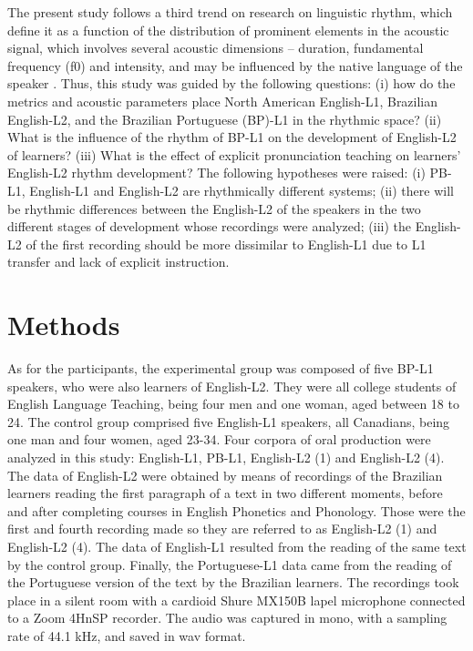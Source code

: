 The present study follows a third trend on research on linguistic rhythm, which
define it as a function of the distribution of prominent elements in the
acoustic signal, which involves several acoustic dimensions – duration,
fundamental frequency (f0) and intensity, and may be influenced by the native
language of the speaker \citep{cumming2010,fuchs2016,silva2020}.
Thus, this study was guided by the following questions: (i) how do the metrics
and acoustic parameters place North American English-L1, Brazilian English-L2,
and the Brazilian Portuguese (BP)-L1 in the rhythmic space? (ii) What is the
influence of the rhythm of BP-L1 on the development of English-L2 of learners?
(iii) What is the effect of explicit pronunciation teaching on learners'
English-L2 rhythm development? The following hypotheses were raised: (i) PB-L1,
English-L1 and English-L2 are rhythmically different systems; (ii) there will
be rhythmic differences between the English-L2 of the speakers in the two
different stages of development whose recordings were analyzed; (iii) the
English-L2 of the first recording should be more dissimilar to English-L1 due
to L1 transfer and lack of explicit instruction. 

\section{Methods}
As for the participants, the experimental group was composed of five BP-L1
speakers, who were also learners of English-L2. They were all college students
of English Language Teaching, being four men and one woman, aged between 18 to
24. The control group comprised five English-L1 speakers, all Canadians, being
one man and four women, aged 23-34. Four corpora of oral production were
analyzed in this study: English-L1, PB-L1, English-L2 (1) and English-L2 (4).
The data of English-L2 were obtained by means of recordings of the Brazilian
learners reading the first paragraph of a text in two different moments, before
and after completing courses in English Phonetics and Phonology. Those were the
first and fourth recording made so they are referred to as English-L2 (1) and
English-L2 (4). The data of English-L1 resulted from the reading of the same
text by the control group. Finally, the Portuguese-L1 data came from the
reading of the Portuguese version of the text by the Brazilian learners. The
recordings took place in a silent room with a cardioid Shure MX150B lapel
microphone connected to a Zoom 4HnSP recorder. The audio was captured in mono,
with a sampling rate of 44.1 kHz, and saved in wav format.


